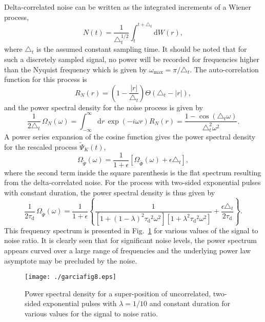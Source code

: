 \documentclass[aps,prb,12pt,a4paper,preprint,amsmath,amssymb,groupedaddress]{revtex4-1}
\newcommand{\abs}[1]{{\left|#1\right|}}\newcommand{\order}[1]{{\mathcal{O}\left(#1\right)}}
\newcommand{\rmd}{\text{d}}
\newcommand{\taud}{\ensuremath{\tau_\text{d}}}
\newcommand{\Phiwt}{\ensuremath{\widetilde{\Phi}}}
\newcommand{\Psiwt}{\ensuremath{\widetilde{\Psi}}}
\newcommand{\Figref}[1]{Fig.~\ref{#1}}
\begin{document}
Delta-correlated noise can be written as the integrated increments of a Wiener process,
\begin{equation}
N(t) = \frac{1}{\triangle_t^{1/2}} \int_t^{t+\triangle_t} \rmd W(r) ,
\end{equation}
where $\triangle_t$ is the assumed constant sampling time. It should be noted that for such a discretely sampled signal, no power will be recorded for frequencies higher than the Nyquist frequency which is given by $\omega_\text{max}=\pi/\triangle_t$. The auto-correlation function for this process is
\begin{equation}
R_N(r) = \left( 1 - \frac{\abs{r}}{\triangle_t} \right)\Theta(\triangle_t-\abs{r}) ,
\end{equation}
and the power spectral density for the noise process is given by
\begin{equation}
\frac{1}{2\triangle_t}\,\Omega_N(\omega) = \int_{-\infty}^\infty \rmd r\,\exp(-i\omega r)R_N(r) = \frac{1-\cos(\triangle_t\omega)}{\triangle_t^2\omega^2} .
\end{equation}
A power series expansion of the cosine function gives the power spectral density for the rescaled process $\Psiwt_K(t)$,
\begin{equation}
\Omega_{\Psiwt}(\omega) = \frac{1}{1+\epsilon}\left[ \Omega_{\Phiwt}(\omega) + \epsilon\triangle_t \right] ,
\end{equation}
where the second term inside the square parenthesis is the flat spectrum resulting from the delta-correlated noise. For the process with two-sided exponential pulses with constant duration, the power spectral density is thus given by
\begin{equation}
\frac{1}{2\taud}\,\Omega_{\Psiwt}(\omega) = \frac{1}{1+\epsilon}\left\{ \frac{1}{\left[ 1+(1-\lambda)^2\taud^2\omega^2 \right]\left[ 1+\lambda^2\taud^2\omega^2 \right]} + \frac{\epsilon\triangle_t}{2\taud} \right\} .
\end{equation}
This frequency spectrum is presented in \Figref{fig:psd-exp-noise} for various values of the signal to noise ratio. It is clearly seen that for significant noise levels, the power spectrum appears curved over a large range of frequencies and the underlying power law asymptote may be precluded by the noise.


\begin{figure}
\texttt{[image: ./garciafig8.eps]}
\caption{Power spectral density for a super-position of uncorrelated, two-sided exponential pulses with $\lambda=1/10$ and constant duration for various values for the signal to noise ratio.}
\label{fig:psd-exp-noise}
\end{figure}
\end{document}
